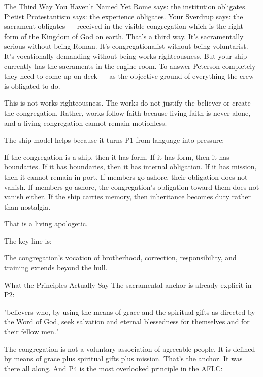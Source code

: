 

The Third Way You Haven't Named Yet
Rome says: the institution obligates.
Pietist Protestantism says: the experience obligates.
Your Sverdrup says: the sacrament obligates — received in the visible congregation which is the right form of the Kingdom of God on earth.
That's a third way. It's sacramentally serious without being Roman. It's congregationalist without being voluntarist. It's vocationally demanding without being works righteousness.
But your ship currently has the sacraments in the engine room. To answer Peterson completely they need to come up on deck — as the objective ground of everything the crew is obligated to do.



This is not works-righteousness. The works do not justify the believer or create the congregation. Rather, works follow faith because living faith is never alone, and a living congregation cannot remain motionless.






The ship model helps because it turns P1 from language into pressure:

If the congregation is a ship, then it has form.
If it has form, then it has boundaries.
If it has boundaries, then it has internal obligation.
If it has mission, then it cannot remain in port.
If members go ashore, their obligation does not vanish.
If members go ashore, the congregation’s obligation toward them does not vanish either.
If the ship carries memory, then inheritance becomes duty rather than nostalgia.

That is a living apologetic.

The key line is:

The congregation’s vocation of brotherhood, correction, responsibility, and training extends beyond the hull.









What the Principles Actually Say
The sacramental anchor is already explicit in P2:

"believers who, by using the means of grace and the spiritual gifts as directed by the Word of God, seek salvation and eternal blessedness for themselves and for their fellow men."

The congregation is not a voluntary association of agreeable people. It is defined by means of grace plus spiritual gifts plus mission. That's the anchor. It was there all along.
And P4 is the most overlooked principle in the AFLC:

